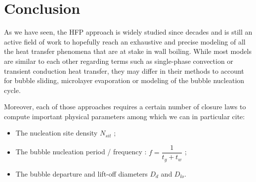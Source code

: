 %
%
%
%
%


\section{Conclusion}


As we have seen, the HFP approach is widely studied since decades and is still an active field of work to hopefully reach an exhaustive and precise modeling of all the heat transfer phenomena that are at stake in wall boiling. While most models are similar to each other regarding terms such as single-phase convection or transient conduction heat transfer, they may differ in their methods to account for bubble sliding, microlayer evaporation or modeling of the bubble nucleation cycle.

\npar

Moreover, each of those approaches requires a certain number of closure laws to compute important physical parameters among which we can in particular cite:
\begin{itemize}
\item The nucleation site density $N_{sit}$ ;
\item The bubble nucleation period / frequency : $f=\dfrac{1}{t_{g}+t_{w}}$ ;
\item The bubble departure and lift-off diameters $D_{d}$ and $D_{lo}$.
\end{itemize}

\npar

